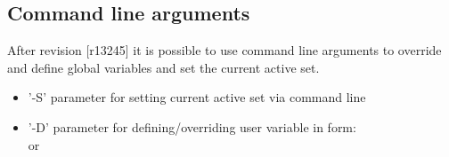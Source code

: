 \subsection{Command line arguments}\label{sec:cmdline_args}
After revision [r13245] it is possible to use command line arguments to override and define global variables and set the current active set.
\begin{itemize}
\item '-S' parameter for setting current active set via command line
\item '-D' parameter for defining/overriding user variable in form:\\
  or 
\end{itemize}